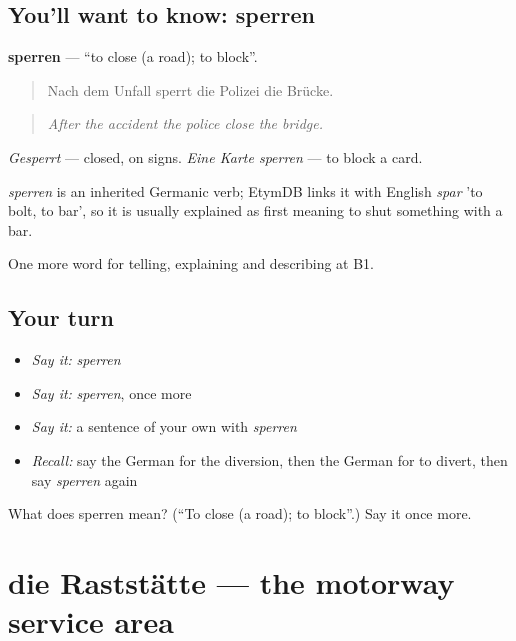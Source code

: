 \subsection*{You'll want to know: sperren}
\textbf{sperren} — \textquotedblleft{}to close (a road); to block\textquotedblright{}.

\begin{quote}
Nach dem Unfall sperrt die Polizei die Brücke.
\end{quote}

\begin{quote}
\emph{After the accident the police close the bridge.}
\end{quote}

\emph{Gesperrt} — closed, on signs. \emph{Eine Karte sperren} — to block a card.

\begin{cousinweb}
\emph{sperren} is an inherited Germanic verb; EtymDB links it with English \emph{spar} 'to bolt, to bar', so it is usually explained as first meaning to shut something with a bar.
\end{cousinweb}

\begin{grammarlens}[title={What you've built}]
One more word for telling, explaining and describing at B1.
\end{grammarlens}

\subsection*{Your turn}
\begin{itemize}
\raggedright
  \item \emph{Say it:} \emph{sperren}
  \item \emph{Say it:} \emph{sperren}, once more
  \item \emph{Say it:} a sentence of your own with \emph{sperren}
  \item \emph{Recall:} say the German for the diversion, then the German for to divert, then say \emph{sperren} again
\end{itemize}

\begin{tcolorbox}[breakable,colback=teal!4,colframe=teal!35!black,title={Before you move on}]
What does sperren mean? (\textquotedblleft{}To close (a road); to block\textquotedblright{}.) Say it once more.
\end{tcolorbox}
\section[die Raststätte]{die Raststätte — the motorway service area}

